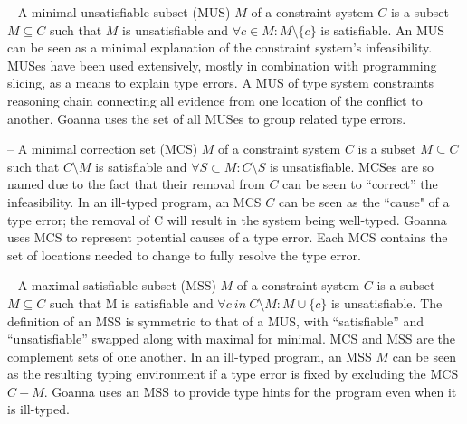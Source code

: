         
    – A minimal unsatisfiable subset (MUS) $M$ of a constraint system $C$ is a subset $M \subseteq C$ such that $M$ is unsatisfiable and $ \forall{c} \in M : M \setminus \{c\}$ is satisfiable. An MUS can be seen as a minimal explanation of the constraint system’s infeasibility. MUSes have been used extensively, mostly in combination with programming slicing, as a means to explain type errors. A MUS of type system constraints reasoning chain connecting all evidence from one location of the conflict to another. Goanna uses the set of all MUSes to group related type errors.

    – A minimal correction set (MCS) $M$ of a constraint system $C$ is a subset $M \subseteq C$ such that $C \setminus M$ is satisfiable and $\forall{S} \subset M : C \setminus S$ is unsatisfiable. MCSes are so named due to the fact that their removal from $C$ can be seen to “correct” the infeasibility. In an ill-typed program, an MCS $C$ can be seen as the ``cause" of a type error; the removal of C will result in the system being well-typed. Goanna uses MCS to represent potential causes of a type error. Each MCS contains the set of locations needed to change to fully resolve the type error.
    
  – A maximal satisfiable subset (MSS) $M$ of a constraint system $C$ is a subset $M \subseteq C$ such that M is satisfiable and $\forall{c}\ in\ C \setminus M:M\cup\{c\}$ is unsatisfiable. The definition of an MSS is symmetric to that of a MUS, with “satisfiable” and “unsatisfiable” swapped along with maximal for minimal. MCS and MSS are the complement sets of one another. In an ill-typed program, an MSS $M$ can be seen as the resulting typing environment if a type error is fixed by excluding the MCS $C - M$. Goanna uses an MSS to provide type hints for the program even when it is ill-typed.
  

